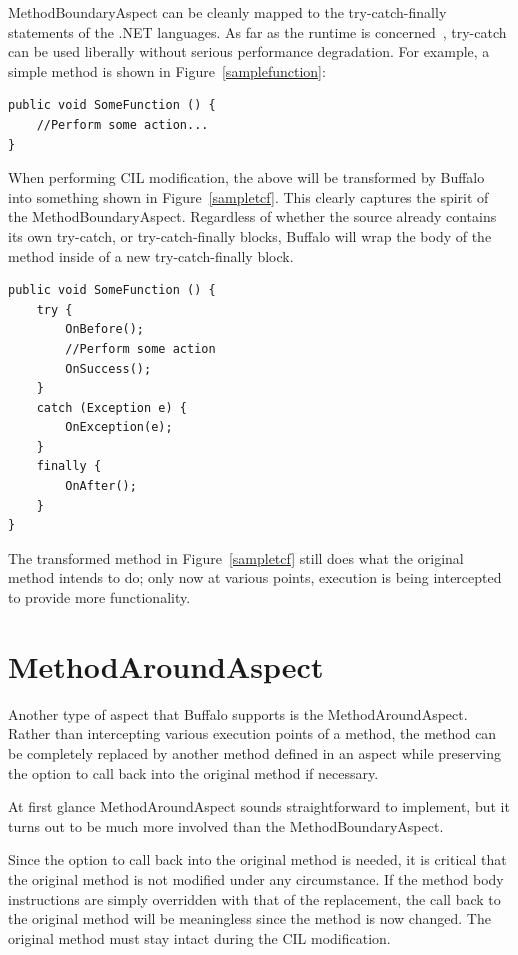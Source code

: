 MethodBoundaryAspect can be cleanly mapped to the try-catch-finally statements of the .NET languages. As far as the runtime is concerned~\cite{ecma334, ecma335}, try-catch can be used liberally without serious performance degradation. For example, a simple method is shown in Figure~\ref{samplefunction}:

\begin{lstlisting}[caption={Sample Function}, label=samplefunction]
public void SomeFunction () {
    //Perform some action...
}
\end{lstlisting}

When performing CIL modification, the above will be transformed by Buffalo into something shown in Figure~\ref{sampletcf}. This clearly captures the spirit of the MethodBoundaryAspect. Regardless of whether the source already contains its own try-catch, or try-catch-finally blocks, Buffalo will wrap the body of the method inside of a new try-catch-finally block.

\begin{lstlisting}[caption={Sample Try-catch-finally}, label=sampletcf]
public void SomeFunction () {
    try {
        OnBefore();
        //Perform some action
        OnSuccess();
    }
    catch (Exception e) {
        OnException(e);
    }
    finally {
        OnAfter();
    }
}
\end{lstlisting}

The transformed method in Figure~\ref{sampletcf} still does what the original method intends to do; only now at various points, execution is being intercepted to provide more functionality. 

\section{MethodAroundAspect}
Another type of aspect that Buffalo supports is the MethodAroundAspect. Rather than intercepting various execution points of a method, the method can be completely replaced by another method defined in an aspect while preserving the option to call back into the original method if necessary.

At first glance MethodAroundAspect sounds straightforward to implement, but it turns out to be much more involved than the MethodBoundaryAspect.

Since the option to call back into the original method is needed, it is critical that the original method is not modified under any circumstance. If the method body instructions are simply overridden with that of the replacement, the call back to the original method will be meaningless since the method is now changed. The original method must stay intact during the CIL modification.

